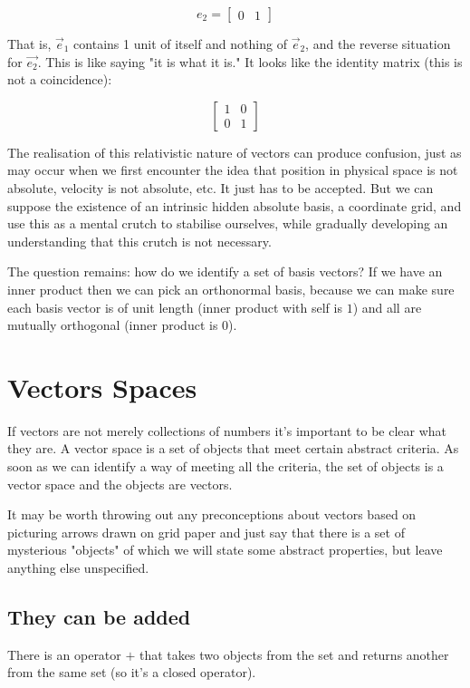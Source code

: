 $$e_2 = \begin{bmatrix}0 & 1\end{bmatrix}$$

That is, $\vec{e}_1$ contains 1 unit of itself and nothing of $\vec{e}_2$, and the reverse situation for $\vec{e_2}$. This is like saying "it is what it is." It looks like the identity matrix (this is not a coincidence):

$$
\begin{bmatrix}1 & 0 \\ 0 & 1\end{bmatrix}
$$

The realisation of this relativistic nature of vectors can produce confusion, just as may occur when we first encounter the idea that position in physical space is not absolute, velocity is not absolute, etc. It just has to be accepted. But we can suppose the existence of an intrinsic hidden absolute basis, a coordinate grid, and use this as a mental crutch to stabilise ourselves, while gradually developing an understanding that this crutch is not necessary.

The question remains: how do we identify a set of basis vectors? If we have an inner product then we can pick an orthonormal basis, because we can make sure each basis vector is of unit length (inner product with self is $1$) and all are mutually orthogonal (inner product is $0$).

\section{Vectors Spaces}

If vectors are not merely collections of numbers it's important to be clear what they are. A vector space is a set of objects that meet certain abstract criteria. As soon as we can identify a way of meeting all the criteria, the set of objects is a vector space and the objects are vectors.

It may be worth throwing out any preconceptions about vectors based on picturing arrows drawn on grid paper and just say that there is a set of mysterious "objects" of which we will state some abstract properties, but leave anything else unspecified.

\subsection{They can be added}

There is an operator $+$ that takes two objects from the set and returns another from the same set (so it's a closed operator).

